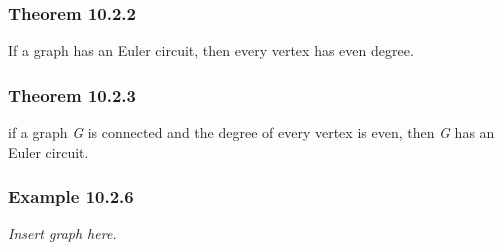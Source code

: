 \documentclass{article}
\begin{document}
\subsubsection{Theorem 10.2.2}
If a graph has an Euler circuit, then every vertex has even degree.

\subsubsection{Theorem 10.2.3}
if a graph \textit{G} is connected and the degree of every vertex is even, then \textit{G} has an Euler circuit.

\subsubsection{Example 10.2.6}
\textit{Insert graph here.}
\end{document}
